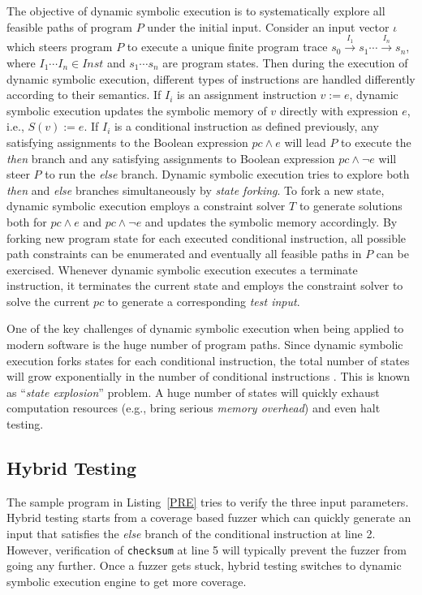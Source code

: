 The objective of dynamic symbolic execution is to systematically explore all feasible paths of program $P$ under the initial input.
 Consider an input vector $\iota$ which steers program $P$ to execute a unique finite program trace $s_0\xrightarrow{I_1}s_1\cdots\xrightarrow{I_n}s_n$, where $I_1\cdots I_n\in Inst$ and $s_1\cdots s_n$ are program states.
 Then during the execution of dynamic symbolic execution, different types of instructions are handled differently according to their semantics.
 If $I_i$ is an assignment instruction $v:=e$, dynamic symbolic execution updates the symbolic memory of $v$ directly with expression $e$, i.e., $S(v):= e$. 
 If $I_i$ is a conditional instruction as defined previously, any satisfying assignments to the Boolean expression $pc\wedge e$ will lead $P$ to execute the \textit{then} branch and any satisfying assignments to Boolean expression $pc\wedge\neg e$ will steer $P$ to run the \textit{else} branch. 
 Dynamic symbolic execution tries to explore both \textit{then} and \textit{else} branches simultaneously by \textit{state forking}.
 To fork a new state, dynamic symbolic execution employs a constraint solver $T$ to generate solutions both for $pc\wedge e$ and $pc\wedge\neg e$ and updates the symbolic memory accordingly.
 By forking new program state for each executed conditional instruction, all possible path constraints can be enumerated and eventually all feasible paths in $P$ can be exercised.
 Whenever dynamic symbolic execution executes a terminate instruction, it terminates the current state and employs the constraint solver to solve the current $pc$ to generate a corresponding \textit{test input}.

One of the key challenges of dynamic symbolic execution when being applied to modern software is the huge number of program paths.
 Since dynamic symbolic execution forks states for each conditional instruction, the total number of states will grow exponentially in the number of conditional instructions \cite{cadar2013symbolic}.
 This is known as ``\textit{state explosion}'' problem.
 A huge number of states will quickly exhaust computation resources (e.g., bring serious \textit{memory overhead}) and even halt testing.



\subsection{Hybrid Testing}
The sample program in Listing~\ref{PRE} tries to verify the three input parameters.
 Hybrid testing starts from a coverage based fuzzer which can quickly generate an input that satisfies the \textit{else} branch of the conditional instruction at line 2.
 However, verification of \texttt{checksum} at line 5 will typically prevent the fuzzer from going any further.
 Once a fuzzer gets stuck, hybrid testing switches to dynamic symbolic execution engine to get more coverage.

